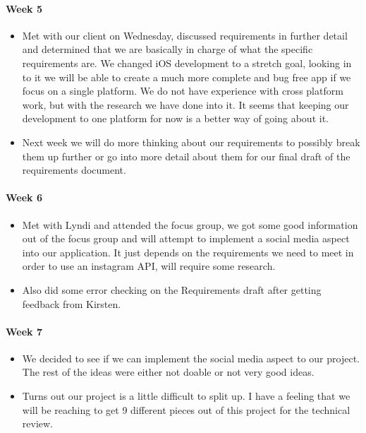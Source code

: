 \documentclass[onecolumn, draftclsnofoot,10pt, compsoc]{IEEEtran}
\begin{document}
      \paragraph{Week 5}
        \begin{itemize}
          \item Met with our client on Wednesday, discussed requirements in further detail and determined that we are basically in charge of what the specific requirements are. We changed iOS development to a stretch goal, looking in to it we will be able to create a much more complete and bug free app if we focus on a single platform. We do not have experience with cross platform work, but with the research we have done into it. It seems that keeping our development to one platform for now is a better way of going about it.
          \item Next week we will do more thinking about our requirements to possibly break them up further or go into more detail about them for our final draft of the requirements document.
        \end{itemize}

      \paragraph{Week 6}
        \begin{itemize}
          \item Met with Lyndi and attended the focus group, we got some good information out of the focus group and will attempt to implement a social media aspect into our application. It just depends on the requirements we need to meet in order to use an instagram API, will require some research.
          \item Also did some error checking on the Requirements draft after getting feedback from Kirsten.
        \end{itemize}

      \paragraph{Week 7}
        \begin{itemize}
          \item We decided to see if we can implement the social media aspect to our project. The rest of the ideas were either not doable or not very good ideas.
          \item Turns out our project is a little difficult to split up. I have a feeling that we will be reaching to get 9 different pieces out of this project for the technical review.
        \end{itemize}
\end{document}
